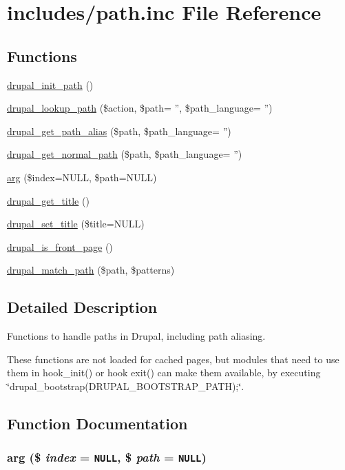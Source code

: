\hypertarget{path_8inc}{
\section{includes/path.inc File Reference}
\label{path_8inc}
}
\subsection*{Functions}
\begin{CompactItemize}
\item 
\hyperlink{path_8inc_a48952219ea86162a3ee2ed9376e85cd}{drupal\_\-init\_\-path} ()
\item 
\hyperlink{path_8inc_0a07f2b00318357e63a351c4973f71c8}{drupal\_\-lookup\_\-path} (\$action, \$path= '', \$path\_\-language= '')
\item 
\hyperlink{path_8inc_7612fff6aaa1c06710c753d06ba8c585}{drupal\_\-get\_\-path\_\-alias} (\$path, \$path\_\-language= '')
\item 
\hyperlink{path_8inc_2f403630c5d004dd8d9936f46a1bb4cb}{drupal\_\-get\_\-normal\_\-path} (\$path, \$path\_\-language= '')
\item 
\hyperlink{path_8inc_fd40bf1dc5dc1f68fb326a8f6e0b88da}{arg} (\$index=NULL, \$path=NULL)
\item 
\hyperlink{path_8inc_88f660bf675e572de22a8469841bbd08}{drupal\_\-get\_\-title} ()
\item 
\hyperlink{path_8inc_0594db78ce77c7d581a44d1337a45a41}{drupal\_\-set\_\-title} (\$title=NULL)
\item 
\hyperlink{path_8inc_657eb4770879ad6f0dc19bfad2cd4a6d}{drupal\_\-is\_\-front\_\-page} ()
\item 
\hyperlink{path_8inc_1299e390360982cc8fbebe06f0232e18}{drupal\_\-match\_\-path} (\$path, \$patterns)
\end{CompactItemize}


\subsection{Detailed Description}
Functions to handle paths in Drupal, including path aliasing.

These functions are not loaded for cached pages, but modules that need to use them in hook\_\-init() or hook exit() can make them available, by executing \char`\"{}drupal\_\-bootstrap(DRUPAL\_\-BOOTSTRAP\_\-PATH);\char`\"{}. 

\subsection{Function Documentation}
\hypertarget{path_8inc_fd40bf1dc5dc1f68fb326a8f6e0b88da}{
\subsubsection[{arg}]{\setlength{\rightskip}{0pt plus 5cm}arg (\$ {\em index} = {\tt NULL}, \/  \$ {\em path} = {\tt NULL})}}
\label{path_8inc_fd40bf1dc5dc1f68fb326a8f6e0b88da}



